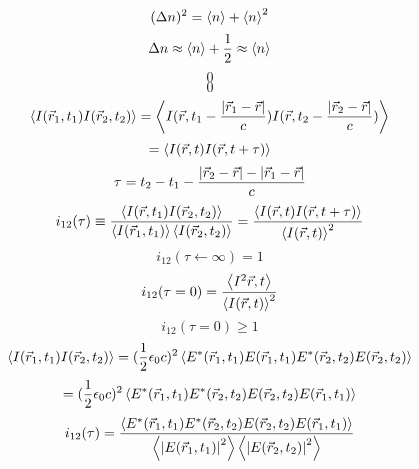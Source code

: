 \documentclass[9pt]{article}
\begin{document}
\begin{equation}
    (\Delta{n})^2=\ev{n}+\ev{n}^2
\end{equation}
\begin{equation}
    \Delta n \approx \ev{n} + \frac{1}{2} \approx \ev{n}
\end{equation}
\begin{equation}
0  
\end{equation}
\begin{equation}
0
\end{equation}
\begin{equation}
    \ev{I(\vec{r}_1,t_1)I(\vec{r}_2,t_2)}=\ev{I(\vec{r},t_1-\frac{\abs{\vec{r}_1-\vec{r}}}{c})I(\vec{r},t_2-\frac{\abs{\vec{r}_2-\vec{r}}}{c})}
\end{equation}
\begin{equation*}
    =\ev{I(\vec{r},t)I(\vec{r},t+\tau)}
\end{equation*}
\begin{equation}
    \tau=t_2-t_1 - \frac{\abs{\vec{r}_2-\vec{r}}-\abs{\vec{r}_1-\vec{r}}}{c}
\end{equation}
\begin{equation}
    i_{12}(\tau)\equiv \frac{\ev{I(\vec{r},t_1)I(\vec{r}_2,t_2)}}{\ev{I(\vec{r}_1,t_1)}\ev{I(\vec{r}_2,t_2)}}=\frac{\ev{I(\vec{r},t)I(\vec{r},t+\tau)}}{\ev{I(\vec{r},t)}^2}
\end{equation}
\begin{equation}
    i_{12}(\tau \leftarrow \infty) =1
\end{equation}
\begin{equation}
    i_{12}(\tau=0)=\frac{\ev{I^2{\vec{r},t}}}{\ev{I(\vec{r},t)}^2}
\end{equation}
\begin{equation}
    i_{12}(\tau=0)\geq 1
\end{equation}
\begin{equation}
    \ev{I(\vec{r}_1,t_1)I(\vec{r}_2,t_2)}=(\frac{1}{2}\epsilon_0 c)^2 \ev{E^*(\vec{r}_1,t_1)E(\vec{r}_1,t_1)E^*(\vec{r}_2,t_2)E(\vec{r}_2,t_2)}
\end{equation}
\begin{equation*}
    =(\frac{1}{2}\epsilon_0 c)^2 \ev{E^*(\vec{r}_1,t_1)E^*(\vec{r}_2,t_2)E(\vec{r}_2,t_2)E(\vec{r}_1,t_1)}
\end{equation*}
\begin{equation}
    i_{12}(\tau)=\frac{\ev{E^*(\vec{r}_1,t_1)E^*(\vec{r}_2,t_2)E(\vec{r}_2,t_2)E(\vec{r}_1,t_1)}}{\ev{\abs{E(\vec{r}_1,t_1)}^2}\ev{\abs{E(\vec{r}_2,t_2)}^2}}
\end{equation}
\end{document}
